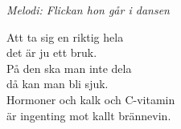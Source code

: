 {\footnotesize\textit{Melodi: Flickan hon går i dansen}}\par
\vspace{10pt}
Att ta sig en riktig hela\\
det är ju ett bruk.\\
På den ska man inte dela\\
då kan man bli sjuk.\\
Hormoner och kalk och C-vitamin\\
är ingenting mot kallt brännevin.
